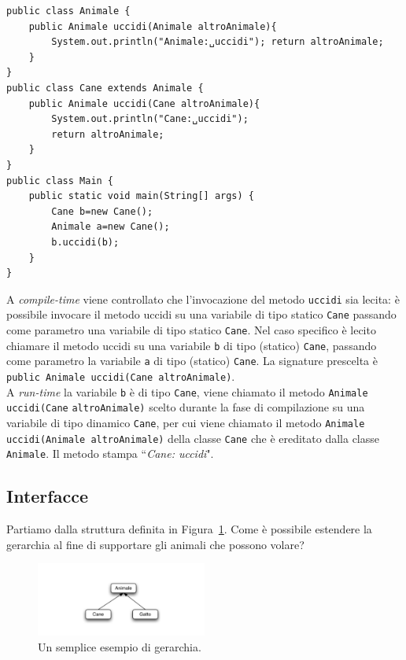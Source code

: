 \documentclass{article}
\begin{document}
\begin{lstlisting}
public class Animale {
    public Animale uccidi(Animale altroAnimale){
        System.out.println("Animale:␣uccidi"); return altroAnimale;
    }
}
public class Cane extends Animale {
    public Animale uccidi(Cane altroAnimale){ 
        System.out.println("Cane:␣uccidi"); 
        return altroAnimale;
    }
}
public class Main {
    public static void main(String[] args) { 
        Cane b=new Cane();
        Animale a=new Cane();
        b.uccidi(b);
    } 
}
\end{lstlisting}
A \emph{compile-time} viene controllato che l'invocazione del metodo \texttt{uccidi} sia lecita: \`e possibile invocare il metodo uccidi su una variabile di tipo statico \texttt{Cane} passando come parametro una variabile di tipo statico \texttt{Cane}. Nel caso specifico \`e lecito chiamare il metodo uccidi su una variabile \texttt{b} di tipo (statico) \texttt{Cane}, passando come parametro la variabile \texttt{a} di tipo (statico) \texttt{Cane}.
La signature prescelta \`e \texttt{public Animale uccidi(Cane altroAnimale)}. \\
A \emph{run-time} la variabile \texttt{b} \`e di tipo \texttt{Cane}, viene chiamato il metodo \texttt{Animale uccidi(Cane} \texttt{altroAnimale)} scelto durante la fase di compilazione su una variabile di tipo dinamico \texttt{Cane}, per cui viene chiamato il metodo \texttt{Animale uccidi(Animale altroAnimale)} della classe \texttt{Cane} che \`e ereditato dalla classe \texttt{Animale}. Il metodo stampa ``\textit{Cane: uccidi}".

\subsection{Interfacce}
Partiamo dalla struttura definita in Figura~\ref{Fig:gerarchy2}. Come \`e possibile estendere la gerarchia al fine di supportare gli animali che possono volare?

\begin{figure}[h!]
  \centering
    \includegraphics[width=0.5\textwidth]{gerarchia.pdf}
      \caption{Un semplice esempio di gerarchia.}
      \label{Fig:gerarchy2}
\end{figure}
\end{document}
